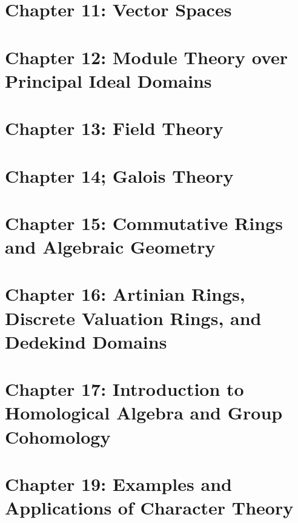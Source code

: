 \documentclass[11pt]{article}
\theoremstyle{definition}
\theoremstyle{remark}
\numberwithin{equation}{section}
\numberwithin{thm}{subsection}
\begin{document}
\newpage

\section{Chapter 11: Vector Spaces}

\newpage
\section{Chapter 12: Module Theory over Principal Ideal Domains}

\newpage

\section{Chapter 13: Field Theory}

\newpage

\section{Chapter 14; Galois Theory}

\newpage


\section{Chapter 15: Commutative Rings and Algebraic Geometry}

\newpage

\section{Chapter 16: Artinian Rings, Discrete Valuation Rings, and Dedekind Domains}


\newpage

\section{Chapter 17: Introduction to Homological Algebra and Group Cohomology}

\newpage



\section{Chapter 19: Examples and Applications of Character Theory}
\end{document}

